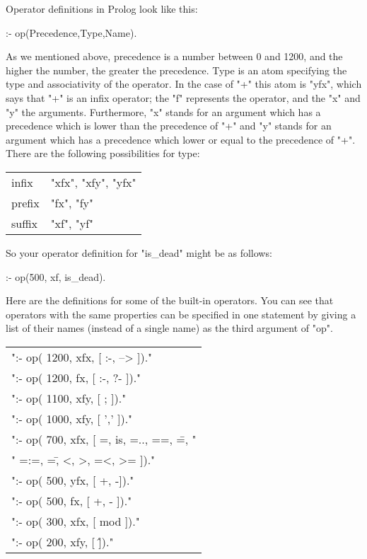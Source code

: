 Operator definitions in Prolog look like this:  
\begin{LPNcodedisplay}
:- op(Precedence,Type,Name).
\end{LPNcodedisplay}
As we mentioned above, precedence is a number between 0 and 1200, and
the higher the number, the greater the  precedence.
Type is an
atom specifying the type and associativity of the operator. In the
case of "+" this atom is "yfx", which says that "+" is an infix
operator; the "f" represents the operator,  and the "x" and "y" the
arguments.  Furthermore, "x" stands for an argument which has a
precedence which is lower than the precedence of "+" and "y" stands
for an argument which has a precedence which lower or equal to the
precedence of "+".  There are the following possibilities for
type:
\begin{center}\begin{tabular}{ll}
infix&"xfx", "xfy", "yfx"\\
prefix&"fx", "fy"\\
suffix&"xf", "yf"
\end{tabular}\end{center}

So  your operator definition for "is\_dead" might be as follows:
\begin{LPNcodedisplay}
:- op(500, xf, is_dead).
\end{LPNcodedisplay}


Here are the definitions for some of the built-in operators. You can see
that operators with the same properties can be specified in one statement
by giving a list of their names (instead of a single name) as the third
argument of "op".

\begin{center}\begin{tabular}{l}
":- op( 1200, xfx, [ :-, --> ])."\\
":- op( 1200,  fx, [ :-, ?- ])."\\
":- op( 1100, xfy, [ ; ])."\\
":- op( 1000, xfy, [ ',' ])."\\
":- op(  700, xfx, [ =, is, =.., ==, \==, "\\
"                    =:=, =\=, <, >, =<, >= ])."\\
":- op(  500, yfx, [ +, -])."\\
":- op(  500,  fx, [ +, - ])."\\
":- op(  300, xfx, [ mod ])."\\
":- op(  200, xfy, [ \^ ])."
\end{tabular}\end{center}

